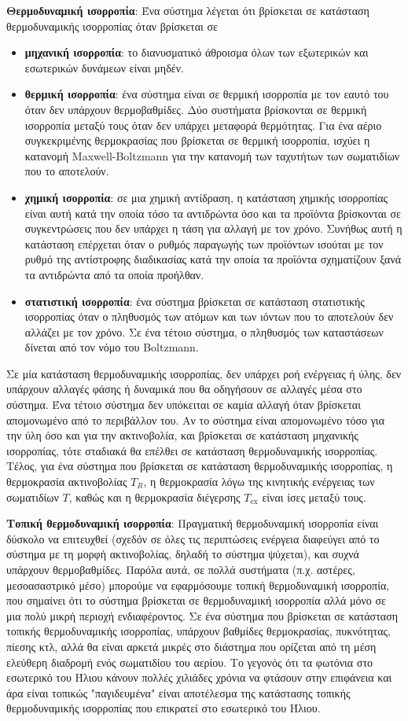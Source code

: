 \textbf{Θερμοδυναμική ισορροπία}: Ένα σύστημα λέγεται ότι βρίσκεται σε κατάσταση θερμοδυναμικής ισορροπίας όταν βρίσκεται σε
\begin{itemize}
    \item \textbf{μηχανική ισορροπία}: το διανυσματικό άθροισμα όλων των εξωτερικών και εσωτερικών δυνάμεων είναι μηδέν.
    \item \textbf{θερμική ισορροπία}: ένα σύστημα είναι σε θερμική ισορροπία με τον εαυτό του όταν δεν υπάρχουν θερμοβαθμίδες. Δύο συστήματα βρίσκονται σε θερμική ισορροπία μεταξύ τους όταν δεν υπάρχει μεταφορά θερμότητας. Για ένα αέριο συγκεκριμένης θερμοκρασίας που βρίσκεται σε θερμική ισορροπία, ισχύει η κατανομή Maxwell-Boltzmann για την κατανομή των ταχυτήτων των σωματιδίων που το αποτελούν.
    \item \textbf{χημική ισορροπία}: σε μια χημική αντίδραση, η κατάσταση χημικής ισορροπίας είναι αυτή κατά την οποία τόσο τα αντιδρώντα όσο και τα προϊόντα βρίσκονται σε συγκεντρώσεις που δεν υπάρχει η τάση για αλλαγή με τον χρόνο. Συνήθως αυτή η κατάσταση επέρχεται όταν ο ρυθμός παραγωγής των προϊόντων ισούται με τον ρυθμό της αντίστροφης διαδικασίας κατά την οποία τα προϊόντα σχηματίζουν ξανά τα αντιδρώντα από τα οποία προήλθαν.
    \item \textbf{στατιστική ισορροπία}: ένα σύστημα βρίσκεται σε κατάσταση στατιστικής ισορροπίας όταν ο πληθυσμός των ατόμων και των ιόντων που το αποτελούν δεν αλλάζει με τον χρόνο. Σε ένα τέτοιο σύστημα, ο πληθυσμός των καταστάσεων δίνεται από τον νόμο του Boltzmann.
\end{itemize}
Σε μία κατάσταση θερμοδυναμικής ισορροπίας, δεν υπάρχει ροή ενέργειας ή ύλης, δεν υπάρχουν αλλαγές φάσης ή δυναμικά που θα οδηγήσουν σε αλλαγές μέσα στο σύστημα. Ένα τέτοιο σύστημα δεν υπόκειται σε καμία αλλαγή όταν βρίσκεται απομονωμένο από το περιβάλλον του. Αν το σύστημα είναι απομονωμένο τόσο για την ύλη όσο και για την ακτινοβολία, και βρίσκεται σε κατάσταση μηχανικής ισορροπίας, τότε σταδιακά θα επέλθει σε κατάσταση θερμοδυναμικής ισορροπίας. Τέλος, για ένα σύστημα που βρίσκεται σε κατάσταση θερμοδυναμικής ισορροπίας, η θερμοκρασία ακτινοβολίας $T_R$, η θερμοκρασία λόγω της κινητικής ενέργειας των σωματιδίων $T$, καθώς και η θερμοκρασία διέγερσης $T_{\text{ex}}$ είναι ίσες μεταξύ τους.

\textbf{Τοπική θερμοδυναμική ισορροπία}: Πραγματική θερμοδυναμική ισορροπία είναι δύσκολο να επιτευχθεί (σχεδόν σε όλες τις περιπτώσεις ενέργεια διαφεύγει από το σύστημα με τη μορφή ακτινοβολίας, δηλαδή το σύστημα ψύχεται), και συχνά υπάρχουν θερμοβαθμίδες. Παρόλα αυτά, σε πολλά συστήματα (π.χ. αστέρες, μεσοασαστρικό μέσο) μπορούμε να εφαρμόσουμε τοπική θερμοδυναμική ισορροπία, που σημαίνει ότι το σύστημα βρίσκεται σε θερμοδυναμική ισορροπία αλλά μόνο σε μια πολύ μικρή περιοχή ενδιαφέροντος. Σε ένα σύστημα που βρίσκεται σε κατάσταση τοπικής θερμοδυναμικής ισορροπίας, υπάρχουν βαθμίδες θερμοκρασίας, πυκνότητας, πίεσης κτλ, αλλά θα είναι αρκετά μικρές στο διάστημα που ορίζεται από τη μέση ελεύθερη διαδρομή ενός σωματιδίου του αερίου.
Το γεγονός ότι τα φωτόνια στο εσωτερικό του Ήλιου κάνουν πολλές χιλιάδες χρόνια να φτάσουν στην επιφάνεια και άρα είναι τοπικώς "παγιδευμένα" είναι αποτέλεσμα της κατάστασης τοπικής θερμοδυναμικής ισορροπίας που επικρατεί στο εσωτερικό του Ήλιου.


